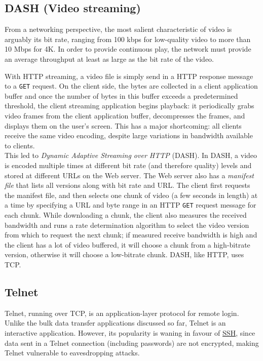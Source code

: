 \documentclass[table, xcdraw]{article}%
\begin{document}
\subsection{DASH (Video streaming)} \label{DASH}

From a networking perspective, the most salient characteristic of video is arguably its bit rate, ranging from 100 kbps for low-quality video to more than 10 Mbps for 4K. In order to provide continuous play, the network must provide an average throughput at least as large as the bit
rate of the video.

With HTTP streaming, a video file is simply send in a HTTP response message to a \texttt{GET} request. On the client side, the bytes are collected in a client application buffer and once the number of bytes in this buffer exceeds a predetermined threshold, the client streaming application begins playback: it periodically grabs video frames from the client application buffer, decompresses the frames, and displays them on the user’s screen. This has a major shortcoming: all clients receive the same video encoding, despite large variations in bandwidth available to clients.\\
This led to \emph{Dynamic Adaptive Streaming over HTTP} (DASH). In DASH, a video is encoded multiple times at different bit rate (and therefore quality) levels and stored at different URLs on the Web server. The Web server also has a \emph{manifest file} that lists all versions along with bit rate and URL. The client first requests the manifest file, and then selects one chunk of video (a few seconds in length) at a time by specifying a URL and byte range in an HTTP \texttt{GET} request message for each chunk. While downloading a chunk, the client also measures the received bandwidth and runs a rate determination algorithm to select the video version from which to request the next chunk; if measured receive bandwidth is high and the client has a lot of video buffered, it will choose a chunk from a high-bitrate version, otherwise it will choose a low-bitrate chunk. DASH, like HTTP, uses TCP.

\subsection{Telnet} \label{telnet}

Telnet, running over TCP, is an application-layer protocol for remote login. Unlike the bulk data transfer applications discussed so far, Telnet is an interactive application. However, its popularity is waning in favour of \hyperref[ssh]{SSH}, since data sent in a Telnet connection (including passwords) are not encrypted, making Telnet vulnerable to eavesdropping attacks.
\end{document}
